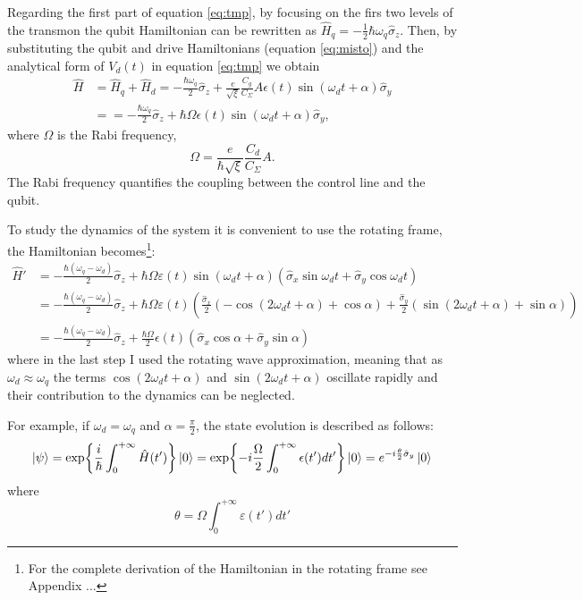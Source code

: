 Regarding the first part of equation \ref{eq:tmp}, by focusing on the firs two levels of the transmon the qubit Hamiltonian can be rewritten as $\hat{H}_q = -\frac{1}{2}\hbar\omega_q\hat{\sigma}_z$.
Then, by substituting the qubit and drive Hamiltonians (equation \ref{eq:misto}) and the analytical form of $V_d(t)$ in equation \ref{eq:tmp} we obtain
\begin{align}
    \hat{H} &= \hat{H}_q + \hat{H}_d = -\frac{\hbar \omega_q}{2} \hat{\sigma}_z + \frac{e}{\sqrt{\xi}} \frac{C_g}{C_{\Sigma}} A \epsilon(t) \sin(\omega_d t + \alpha) \hat{\sigma}_y\\
    &= = -\frac{\hbar \omega_q}{2} \hat{\sigma}_z + \hbar \Omega \epsilon(t) \sin(\omega_d t + \alpha) \hat{\sigma}_y,
\end{align} 
where $\Omega$ is the Rabi frequency, 
\begin{equation}
    \Omega = \frac{e}{\hbar\sqrt{\xi}}\frac{C_d}{C_\Sigma}A.
\end{equation}
The Rabi frequency quantifies the coupling between the control line and the qubit.

To study the dynamics of the system it is convenient to use the rotating frame, the Hamiltonian becomes\footnote{For the complete derivation of the Hamiltonian in the rotating frame see Appendix ...}: %
\begin{align}
    \hat{H}' &= -\frac{\hbar (\omega_q - \omega_d)}{2} \hat{\sigma}_z + \hbar \Omega \varepsilon(t) \sin(\omega_d t + \alpha)\left( \hat{\sigma}_x \sin \omega_d t + \hat{\sigma}_y \cos \omega_d t \right)\\
    &= -\frac{\hbar (\omega_q - \omega_d)}{2} \hat{\sigma}_z + \hbar \Omega \varepsilon(t)\left(\frac{\hat{\sigma}_x}{2} \left( -\cos(2\omega_d t + \alpha) + \cos \alpha \right) + \frac{\hat{\sigma}_y}{2} \left( \sin(2\omega_d t + \alpha) + \sin \alpha \right)\right)\\
    &=  -\frac{\hbar (\omega_q - \omega_d)}{2} \hat{\sigma}_z + \frac{\hbar \Omega}{2} \epsilon(t) \left( \hat{\sigma}_x \cos \alpha + \hat{\sigma}_y \sin \alpha \right)
\end{align}
where in the last step I used the rotating wave approximation, meaning that as $\omega_d\approx\omega_q$ the terms $\cos(2\omega_d t + \alpha)$ and $\sin(2\omega_d t + \alpha)$ oscillate rapidly and their contribution to the dynamics can be neglected.

For example, if $\omega_d = \omega_q$ and $\alpha=\frac{\pi}{2}$, the state evolution is described as follows:
\begin{align}
    \ket{\psi} = \exp{\frac{i}{\hbar}\int_{0}^{+\infty} \hat{H}(t')}\ket{0} = \exp{-i\frac{\Omega}{2}\int_{0}^{+\infty}\epsilon(t')dt'}\ket{0} = e^{-i\frac{\theta}{2}\hat{\sigma}_y}\ket{0}
\end{align}
where
\begin{equation}
    \theta = \Omega\int_{0}^{+\infty}\varepsilon(t')dt'
\end{equation}


